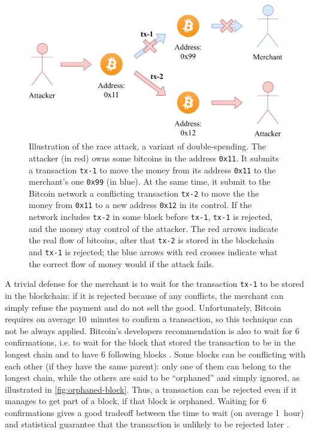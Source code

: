 \begin{figure}[t]
	\centering
	\vspace*{0.25cm}
	\includegraphics[scale=0.75]{figures/race_attack}
	\vspace*{0.25cm}
	\caption[Illustration of the race attack]{
		Illustration of the race attack, a variant of double-spending.
		The attacker (in red) owns some bitcoins in the address \texttt{0x11}.
		It submits a transaction \texttt{tx-1} to move the money from its address \texttt{0x11} to the merchant's one \texttt{0x99} (in blue).
		At the same time, it submit to the Bitcoin network a conflicting transaction \texttt{tx-2} to move the the money from \texttt{0x11} to a new address \texttt{0x12} in its control.
		If the network includes \texttt{tx-2} in some block before \texttt{tx-1}, \texttt{tx-1} is rejected, and the money stay control of the attacker.
		The red arrows indicate the real flow of bitcoins, after that \texttt{tx-2} is stored in the blockchain and \texttt{tx-1} is rejected;
		the blue arrows with red crosses indicate what the correct flow of money would if the attack fails.
	}
	\label{fig:race-attack}
\end{figure}

A trivial defense for the merchant is to wait for the transaction \texttt{tx-1} to be stored in the blockchain:
if it is rejected because of any conflicts, the merchant can simply refuse the payment and do not sell the good.
Unfortunately, Bitcoin requires on average \SI{10}{minutes} to confirm a transaction, so this technique can not be always applied.
Bitcoin's developers recommendation is also to wait for \num{6} confirmations, i.e. to wait for the block that stored the transaction to be in the longest chain and to have \num{6} following blocks \cite{confirmation}.
Some blocks can be conflicting with each other (if they have the same parent):
only one of them can belong to the longest chain, while the others are said to be ``orphaned'' \cite{orphaned_block} and simply ignored, as illustrated in \cref{fig:orphaned-block}.
Thus, a transaction can be rejected even if it manages to get part of a block, if that block is orphaned.
Waiting for \num{6} confirmations gives a good tradeoff between the time to wait (on average \SI{1}{hour}) and statistical guarantee that the transaction is unlikely to be rejected later \cite{bitcoin_2009}.

